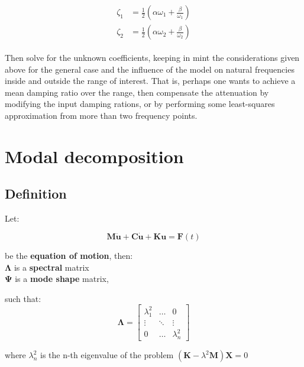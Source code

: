 \documentclass[10pt,b5paper,titlepage]{book}
\newenvironment{ematrix}
{
    \begin{eqnarray}
        \begin{aligned}
}
{
        \end{aligned}
    \end{eqnarray}
}
\begin{document}
\begin{ematrix}
    \zeta_1 &= \frac{1}{2} \left( \alpha \omega_1 + \frac{\beta}{\omega_1} \right)\\
    \zeta_2 &= \frac{1}{2} \left( \alpha \omega_2 + \frac{\beta}{\omega_2} \right)
\end{ematrix}

Then solve for the unknown coefficients, keeping in mint the considerations given
above for the general case and the influence of the model on natural frequencies
inside and outside the range of interest. That is, perhaps one wants to achieve
a mean damping ratio over the range, then compensate the attenuation by modifying
the input damping rations, or by performing some least-squares approximation from
more than two frequency points.







\newpage
\section{Modal decomposition}

\subsection{Definition}

Let:

\begin{equation}
    \mathbf{M}\ddot{\mathbf{u}} + \mathbf{C}\dot{\mathbf{u}} +  \mathbf{K}\mathbf{u} = \mathbf{F}\left( t \right)
\end{equation}

be the \textbf{equation of motion}, then:\\
$ \mathbf{\Lambda} $ is a \textbf{spectral} matrix\\
$ \mathbf{\Psi} $ is a \textbf{mode shape} matrix,

such that:
\begin{equation}
    \mathbf{\Lambda} =
    \begin{bmatrix}
        \lambda_1^2 & \dots & 0\\
        \vdots & \ddots & \vdots \\
        0 & \dots & \lambda_n^2
    \end{bmatrix}
\end{equation}

where $ \lambda_n^2 $ is the n-th eigenvalue of the problem
$ (\mathbf{K}-\lambda^2\mathbf{M})\mathbf{X} = 0 $
\end{document}
